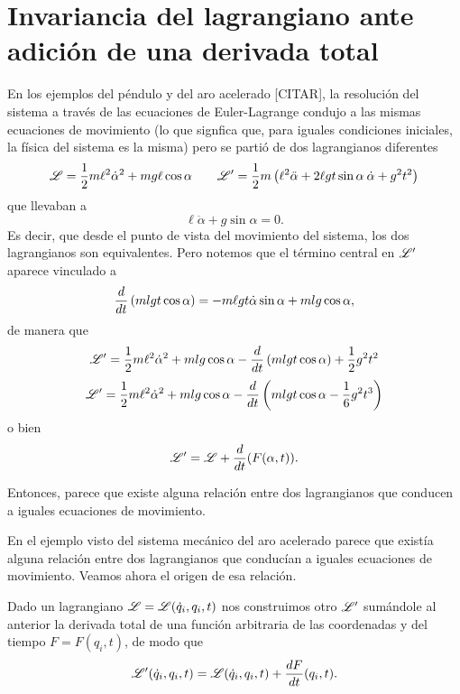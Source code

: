 \documentclass[10pt,oneside]{CBFT_book}
\begin{document}
\section{Invariancia del lagrangiano ante adición de una derivada total}

En los ejemplos del péndulo y del aro acelerado [CITAR], la resolución del sistema a través de las ecuaciones de 
Euler-Lagrange condujo a las mismas ecuaciones de movimiento (lo que signfica que, para iguales condiciones iniciales, 
la física del sistema es la misma) pero se partió de dos lagrangianos diferentes
\[
	\mathscr{L} = \frac 1 2 m \ell^2 \dot{\alpha}^2 + m g \ell \cos \alpha \qquad
	\mathscr{L}'= \frac 1 2 m \left( \ell^2 \ddot{\alpha} + 2 \ell g t \sin \alpha \: \dot{\alpha} + g^2 t^2 \right)
\]
que llevaban a
\[
	\ell \ddot{\alpha} + g \sin \alpha = 0. 
\]
Es decir, que desde el punto de vista del movimiento del sistema, los dos lagrangianos son equivalentes.
Pero notemos que el término central en $\mathscr{L}'$ aparece vinculado a 
\[
	\frac{d^{\hspace{-0.05em}} {}}{d {t}^{\hspace{-0.05em}}}\left( m l g t \cos \alpha \right) = -m \ell g t \dot{\alpha} \sin \alpha + m l g \cos \alpha,
\]
de manera que 
\[
	\mathscr{L}'= \frac 1 2 m \ell^2 \dot{\alpha}^2 + m l g \cos \alpha - \frac{d^{\hspace{-0.05em}} {}}{d {t}^{\hspace{-0.05em}}}\left( m l g t \cos \alpha \right) 
	+ \frac 1 2 g^2 t^2
\]
\[
	\mathscr{L}'= \frac 1 2 m \ell^2 \dot{\alpha}^2 + m l g \cos \alpha - \frac{d^{\hspace{-0.05em}} {}}{d {t}^{\hspace{-0.05em}}}\left( m l g t \cos \alpha 
	- \frac 1 6 g^2 t^3 \right)
\]
o bien 
\[
	\mathscr{L}'= \mathscr{L} + \frac{d^{\hspace{-0.05em}} {}}{d {t}^{\hspace{-0.05em}}}(F(\alpha,t)).
\]

Entonces, parece que existe alguna relación entre dos lagrangianos que conducen a iguales ecuaciones de movimiento.

En el ejemplo visto del sistema mecánico del aro acelerado parece que existía alguna relación entre dos 
lagrangianos que conducían a iguales ecuaciones de movimiento. Veamos ahora el origen de esa relación.

Dado un lagrangiano $\mathscr{L} = \mathscr{L}(\dot{q}_i,q_i,t)$ nos construimos otro $\mathscr{L}'$ sumándole al anterior la 
derivada total de una función arbitraria de las coordenadas y del tiempo $F=F(q_i,t)$, de modo que
\[
	\mathscr{L}'(\dot{q}_i,q_i,t) = \mathscr{L}(\dot{q}_i,q_i,t)+ \frac{d^{\hspace{-0.05em}} {F}}{d {t}^{\hspace{-0.05em}}}(q_i,t) .
\]
\end{document}
